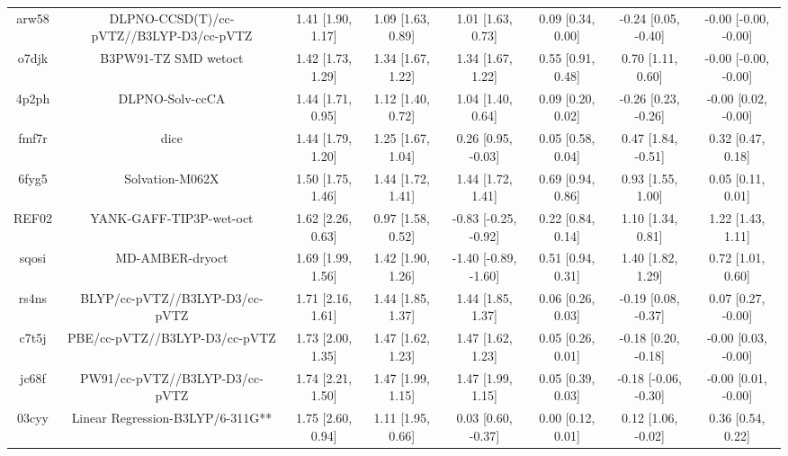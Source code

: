 \documentclass{article}
\begin{document}
\begin{center}
\begin{longtable}{|cccccccc|}
 arw58 &            DLPNO-CCSD(T)/cc-pVTZ//B3LYP-D3/cc-pVTZ &  1.41 [1.90, 1.17] &  1.09 [1.63, 0.89] &     1.01 [1.63, 0.73] &  0.09 [0.34, 0.00] &   -0.24 [0.05, -0.40] &  -0.00 [-0.00, -0.00] \\
 o7djk &                               B3PW91-TZ SMD wetoct &  1.42 [1.73, 1.29] &  1.34 [1.67, 1.22] &     1.34 [1.67, 1.22] &  0.55 [0.91, 0.48] &     0.70 [1.11, 0.60] &  -0.00 [-0.00, -0.00] \\
 4p2ph &                                    DLPNO-Solv-ccCA &  1.44 [1.71, 0.95] &  1.12 [1.40, 0.72] &     1.04 [1.40, 0.64] &  0.09 [0.20, 0.02] &   -0.26 [0.23, -0.26] &   -0.00 [0.02, -0.00] \\
 fmf7r &                                               dice &  1.44 [1.79, 1.20] &  1.25 [1.67, 1.04] &    0.26 [0.95, -0.03] &  0.05 [0.58, 0.04] &    0.47 [1.84, -0.51] &     0.32 [0.47, 0.18] \\
 6fyg5 &                                    Solvation-M062X &  1.50 [1.75, 1.46] &  1.44 [1.72, 1.41] &     1.44 [1.72, 1.41] &  0.69 [0.94, 0.86] &     0.93 [1.55, 1.00] &     0.05 [0.11, 0.01] \\
 REF02 &                            YANK-GAFF-TIP3P-wet-oct &  1.62 [2.26, 0.63] &  0.97 [1.58, 0.52] &  -0.83 [-0.25, -0.92] &  0.22 [0.84, 0.14] &     1.10 [1.34, 0.81] &     1.22 [1.43, 1.11] \\
 sqosi &                                    MD-AMBER-dryoct &  1.69 [1.99, 1.56] &  1.42 [1.90, 1.26] &  -1.40 [-0.89, -1.60] &  0.51 [0.94, 0.31] &     1.40 [1.82, 1.29] &     0.72 [1.01, 0.60] \\
 rs4ns &                     BLYP/cc-pVTZ//B3LYP-D3/cc-pVTZ &  1.71 [2.16, 1.61] &  1.44 [1.85, 1.37] &     1.44 [1.85, 1.37] &  0.06 [0.26, 0.03] &   -0.19 [0.08, -0.37] &    0.07 [0.27, -0.00] \\
 c7t5j &                      PBE/cc-pVTZ//B3LYP-D3/cc-pVTZ &  1.73 [2.00, 1.35] &  1.47 [1.62, 1.23] &     1.47 [1.62, 1.23] &  0.05 [0.26, 0.01] &   -0.18 [0.20, -0.18] &   -0.00 [0.03, -0.00] \\
 jc68f &                     PW91/cc-pVTZ//B3LYP-D3/cc-pVTZ &  1.74 [2.21, 1.50] &  1.47 [1.99, 1.15] &     1.47 [1.99, 1.15] &  0.05 [0.39, 0.03] &  -0.18 [-0.06, -0.30] &   -0.00 [0.01, -0.00] \\
 03cyy &                   Linear Regression-B3LYP/6-311G** &  1.75 [2.60, 0.94] &  1.11 [1.95, 0.66] &    0.03 [0.60, -0.37] &  0.00 [0.12, 0.01] &    0.12 [1.06, -0.02] &     0.36 [0.54, 0.22] \\

\end{longtable}
\end{center}
\end{document}
